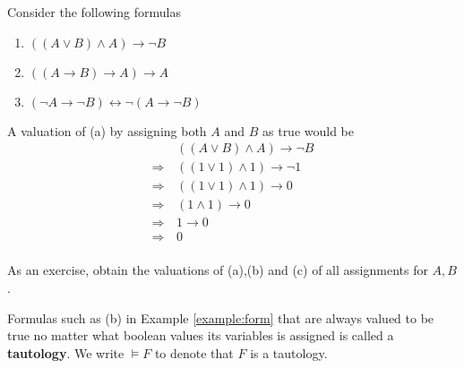 \documentclass[11pt]{book}
\newcommand{\env}[2]{\begin{#1}#2\end{#1}}
\begin{document}
\env{example}{
	\label{example:form}
	Consider the following formulas
	\begin{enumerate}[label=(\alph*)]
		\item $((A\lor B)\land A)\rightarrow \lnot B$
		\item $((A\rightarrow B)\rightarrow A)\rightarrow A$
		\item $(\lnot A\rightarrow\lnot B)\leftrightarrow \lnot(A\rightarrow\lnot B)$
	\end{enumerate}
	A valuation of (a) by assigning both $A$ and $B$ as true would be
	\[
	\begin{aligned}
	&((A\lor B)\land A)\rightarrow \lnot B\\
	\Rightarrow\,&((1\lor 1)\land 1)\rightarrow \lnot 1\\
	\Rightarrow\,&((1\lor 1)\land 1)\rightarrow 0\\
	\Rightarrow\,&(1\land 1)\rightarrow 0\\
	\Rightarrow\,&1\rightarrow 0\\
	\Rightarrow\,& 0\\
	\end{aligned}
	\]
	\iffalse
	\noindent As another example, a valuation of (b) by assigning $A$ as true and $B$ as false is 
	\[
	\begin{aligned}
	&((A\rightarrow B)\rightarrow A)\rightarrow A\\
	\Rightarrow\,&((1\rightarrow 0)\rightarrow 1)\rightarrow 1\\
	\Rightarrow\,&(0\rightarrow 1)\rightarrow 1\\
	\Rightarrow\,& 1\rightarrow 1\\
	\Rightarrow\,& 1\\
	\end{aligned}
	\]
	and in fact, (b) will always be evaluated to be true no matter what boolean values $A,B$ is assigned (verify this!). \fi 
	As an exercise, obtain the valuations of (a),(b) and (c) of all assignments for $A,B$.
}
Formulas such as (b) in Example \ref{example:form} that are always valued to be true no matter what boolean values its variables is assigned is called a \textbf{tautology}. We write $\vDash F$ to denote that $F$ is a tautology.
\end{document}
